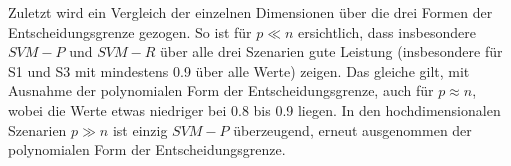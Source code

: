 \documentclass[
]{article}
\begin{document}
Zuletzt wird ein Vergleich der einzelnen Dimensionen über die drei
Formen der Entscheidungsgrenze gezogen. So ist für \(p \ll n\)
ersichtlich, dass insbesondere \(SVM-P\) und \(SVM-R\) über alle drei
Szenarien gute Leistung (insbesondere für S1 und S3 mit mindestens 0.9
über alle Werte) zeigen. Das gleiche gilt, mit Ausnahme der polynomialen
Form der Entscheidungsgrenze, auch für \(p \approx n\), wobei die Werte
etwas niedriger bei 0.8 bis 0.9 liegen. In den hochdimensionalen
Szenarien \(p \gg n\) ist einzig \(SVM-P\) überzeugend, erneut
ausgenommen der polynomialen Form der Entscheidungsgrenze. \newpage


\printbibliography
\end{document}
